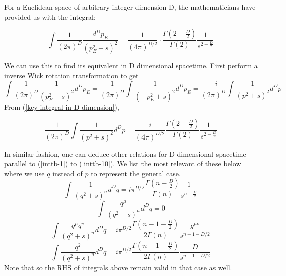 For a Euclidean space of arbitrary integer dimension D, the mathematicians have provided us with the integral:
\begin{qt}
    \begin{equation}\int \frac{1}{(2 \pi)^{D}} \frac{d^{D} p_{E}}{\left(p_{E}^{2}-s\right)^{2}}=\frac{1}{(4 \pi)^{D / 2}} \cdot \frac{\Gamma\left(2-\frac{D}{2}\right)}{\Gamma(2)} \frac{1}{s^{2-\frac{D}{2}}}
    \label{key-integral-in-D-dimension}
    \end{equation}
\end{qt}
We can use this to find its equivalent in D dimensional spacetime. First perform a inverse Wick rotation transformation to get
\begin{equation}\int \frac{1}{(2 \pi)^{D}} \frac{1}{\left(p_{E}^{2}-s\right)^{2}} d^{D} p_{E}=\frac{1}{(2 \pi)^{D}} \int \frac{1}{\left(-p_{E}^{2}+s\right)^{2}} d^{D} p_{E}=\frac{-i}{(2 \pi)^{D}} \int \frac{1}{\left(p^{2}+s\right)^{2}} d^{D} p\end{equation}
From (\ref{key-integral-in-D-dimension}),
\begin{qt}
    \begin{equation}\frac{1}{(2 \pi)^{D}} \int \frac{1}{\left(p^{2}+s\right)^{2}} d^{D} p=\frac{i}{(4 \pi)^{D / 2}} \frac{\Gamma\left(2-\frac{D}{2}\right)}{\Gamma(2)} \frac{1}{s^{2-\frac{D}{2}}}
    \label{key-integral-in-D-spacetime}
    \end{equation}
\end{qt}
In similar fashion, one can deduce other relations for D dimensional spacetime parallel to (\ref{inttb-1}) to (\ref{inttb-10}). We list the most relevant of these below where we use $q$ instead of $p$ to represent the general case. 
\begin{equation}\int \frac{1}{\left(q^{2}+s\right)^{n}} d^{D} q=i \pi^{D / 2} \frac{\Gamma\left(n-\frac{D}{2}\right)}{\Gamma(n)} \frac{1}{s^{n-\frac{D}{2}}}
\label{inttb2-0}
\end{equation}
\begin{equation}\int \frac{q^{\mu}}{\left(q^{2}+s\right)^{n}} d^{D} q=0
\label{inttb2-1}
\end{equation}
\begin{equation}\int \frac{q^{\mu} q^{v}}{\left(q^{2}+s\right)^{n}} d^{D} q=i \pi^{D / 2} \frac{\Gamma\left(n-1-\frac{D}{2}\right)}{2 \Gamma(n)} \frac{g^{\mu \nu}}{s^{n-1-D / 2}}
\label{inttb2-2}
\end{equation}
\begin{equation}\int \frac{q^{2}}{\left(q^{2}+s\right)^{n}} d^{D} q=i \pi^{D / 2} \frac{\Gamma\left(n-1-\frac{D}{2}\right)}{2 \Gamma(n)} \frac{D}{s^{n-1-D / 2}}
\label{inttb2-3}
\end{equation}
Note that  so the RHS of integrals above remain valid in that case as well.

